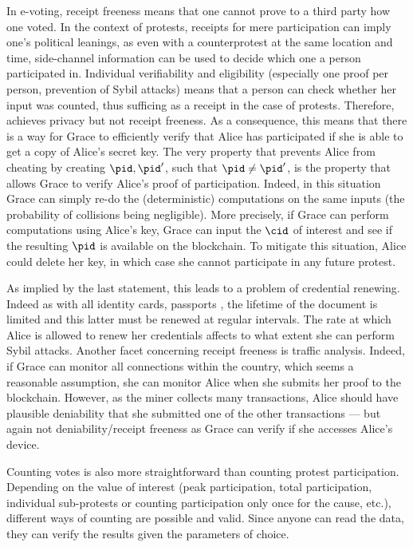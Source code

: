 In e-voting, receipt freeness means that one cannot prove to a third party how one voted. 
In the context of protests, receipts for mere participation can imply one's political leanings, as even with a counterprotest at the same location and time, side-channel information can be used to decide which one a person participated in. 
Individual verifiability and eligibility (especially one proof per person, prevention of Sybil attacks) means that a person can check whether her input was counted, thus sufficing as a receipt in the case of protests.  
Therefore, \PRIVO achieves privacy but not receipt freeness.
As a consequence, this means that there is a way for Grace to efficiently verify that Alice has participated if she is able to get a copy of Alice's secret key. 
The very property that prevents Alice from cheating by creating \(\pid, \pid'\), such that \(\pid \neq \pid'\), is the property that
allows Grace to verify Alice's proof of participation.  
Indeed, in this situation Grace can simply re-do the (deterministic) computations on the same inputs (the probability of collisions being negligible).  
More precisely, if Grace can perform computations using Alice's key, Grace can input the \(\cid\) of interest and see if the resulting \(\pid\) is available on the blockchain.  
To mitigate this situation, Alice could delete her key, in which case she cannot participate in any future protest.  

As implied by the last statement, this leads to a problem of credential renewing.  
Indeed as with all identity cards, passports \etc, the lifetime of the document is limited and this latter must be renewed at regular intervals.  
The rate at which Alice is allowed to renew her credentials affects to what extent she can perform Sybil attacks. 
Another facet concerning receipt freeness is traffic analysis. 
Indeed, if Grace can monitor all connections within the country, which seems a reasonable assumption, she can monitor Alice when she submits her proof to the blockchain. 
However, as the miner collects many transactions, Alice should have plausible deniability that she submitted one of the other transactions --- but again not deniability/receipt freeness as Grace can verify if she accesses Alice's device.

Counting votes is also more straightforward than counting protest participation. 
Depending on the value of interest (\eg peak participation, total participation, individual sub-protests or counting participation only once for the cause, etc.), different ways of counting are
possible and valid. 
Since anyone can read the data, they can verify the results given the parameters of choice.

